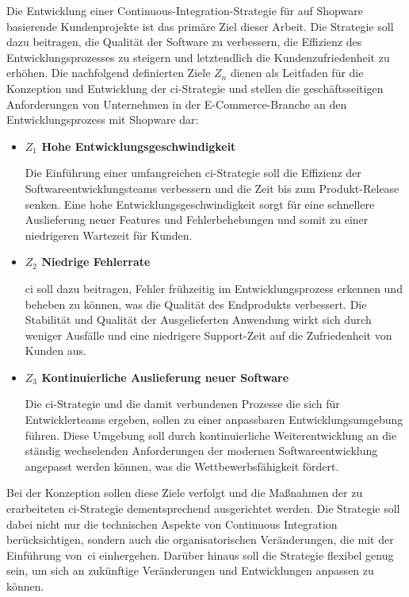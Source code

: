 Die Entwicklung einer Continuous-Integration-Strategie für auf Shopware basierende Kundenprojekte ist das primäre Ziel
dieser Arbeit.
Die Strategie soll dazu beitragen, die Qualität der Software zu verbessern, die Effizienz des Entwicklungsprozesses zu
steigern und letztendlich die Kundenzufriedenheit zu erhöhen.
Die nachfolgend definierten Ziele $Z_n$ dienen als Leitfaden für die Konzeption und Entwicklung der
\acrshort{ci}-Strategie und stellen die geschäftsseitigen Anforderungen von Unternehmen in der E-Commerce-Branche an den
Entwicklungsprozess mit Shopware dar:

\begin{itemize}
    \item {
        \textbf{$Z_1$ Hohe Entwicklungsgeschwindigkeit}\par
        Die Einführung einer umfangreichen \acrshort{ci}-Strategie soll die Effizienz der Softwareentwicklungsteams
        verbessern und die Zeit bis zum Produkt-Release senken.
        Eine hohe Entwicklungsgeschwindigkeit sorgt für eine schnellere Auslieferung neuer Features und Fehlerbehebungen
        und somit zu einer niedrigeren Wartezeit für Kunden.
    }

    \item {
        \textbf{$Z_2$ Niedrige Fehlerrate}\par
        \acrshort{ci} soll dazu beitragen, Fehler frühzeitig im Entwicklungsprozess erkennen und beheben zu können, was
        die Qualität des Endprodukts verbessert.
        Die Stabilität und Qualität der Ausgelieferten Anwendung wirkt sich durch weniger Ausfälle und eine
        niedrigere Support-Zeit auf die Zufriedenheit von Kunden aus.
    }

    \item{
        \textbf{$Z_3$ Kontinuierliche Auslieferung neuer Software}\par
        Die \acrshort{ci}-Strategie und die damit verbundenen Prozesse die sich für Entwicklerteams ergeben, sollen
        zu einer anpassbaren Entwicklungsumgebung führen.
        Diese Umgebung soll durch kontinuierliche Weiterentwicklung an die ständig wechselenden Anforderungen der
        modernen Softwareentwicklung angepasst werden können, was die Wettbewerbsfähigkeit fördert.
    }
\end{itemize}

Bei der Konzeption sollen diese Ziele verfolgt und die Maßnahmen der zu erarbeiteten \acrshort{ci}-Strategie
dementsprechend ausgerichtet werden.
Die Strategie soll dabei nicht nur die technischen Aspekte von Continuous Integration berücksichtigen, sondern auch die
organisatorischen Veränderungen, die mit der Einführung von\ \acrshort{ci} einhergehen.
Darüber hinaus soll die Strategie flexibel genug sein, um sich an zukünftige Veränderungen und Entwicklungen anpassen
zu können.

